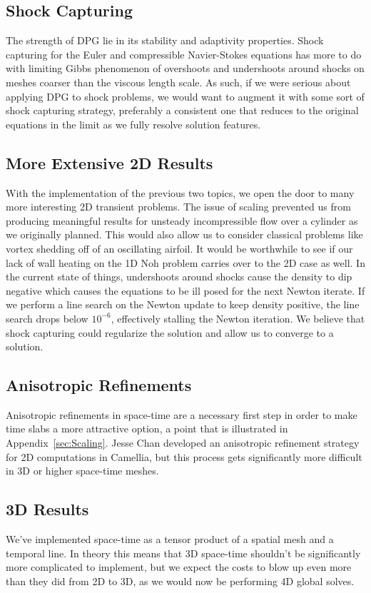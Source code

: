 \documentclass[Dissertation.tex]{subfiles}
\begin{document}
\subsection{Shock Capturing}
The strength of DPG lie in its stability and adaptivity properties. 
Shock capturing for the Euler and compressible Navier-Stokes equations has more to do with 
limiting Gibbs phenomenon of overshoots and undershoots around shocks on meshes coarser than
the viscous length scale.
As such, if we were serious about applying DPG to shock problems, we would want to augment it
with some sort of shock capturing strategy, preferably a consistent one that reduces to the original
equations in the limit as we fully resolve solution features.

\subsection{More Extensive 2D Results}
With the implementation of the previous two topics, we open the door to many more interesting 2D 
transient problems.
The issue of scaling prevented us from producing meaningful results for unsteady incompressible
flow over a cylinder as we originally planned.
This would also allow us to consider classical problems like vortex shedding off of an oscillating
airfoil.
It would be worthwhile to see if our lack of wall heating on the 1D Noh problem carries over to the 
2D case as well. 
In the current state of things, undershoots around shocks cause the density to dip negative 
which causes the equations to be ill posed for the next Newton iterate. 
If we perform a line search on the Newton update to keep density positive, the line 
search drops below $10^{-6}$, effectively stalling the Newton iteration.
We believe that shock capturing could regularize the solution and allow us to converge to a solution.

\subsection{Anisotropic Refinements}
Anisotropic refinements in space-time are a necessary first step in order to make
time slabs a more attractive option, a point that is illustrated in Appendix~\ref{sec:Scaling}.
Jesse Chan developed an anisotropic refinement strategy for 2D computations in Camellia, 
but this process gets significantly more difficult in 3D or higher space-time meshes.

\subsection{3D Results}
We've implemented space-time as a tensor product of a spatial mesh and a temporal line. 
In theory this means that 3D space-time shouldn't be significantly more complicated to implement,
but we expect the costs to blow up even more than they did from 2D to 3D, as we would now be performing
4D global solves.
\end{document}
